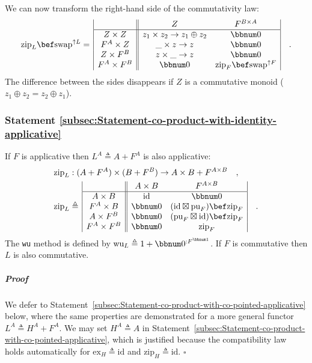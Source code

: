 We can now transform the right-hand side of the commutativity law:
\[
\text{zip}_{L}\bef\text{swap}^{\uparrow L}=\,\begin{array}{|c||cc|}
 & Z & F^{B\times A}\\
\hline Z\times Z & z_{1}\times z_{2}\rightarrow z_{1}\oplus z_{2} & \bbnum 0\\
F^{A}\times Z & \_\times z\rightarrow z & \bbnum 0\\
Z\times F^{B} & z\times\_\rightarrow z & \bbnum 0\\
F^{A}\times F^{B} & \bbnum 0 & \text{zip}_{F}\bef\text{swap}^{\uparrow F}
\end{array}\quad.
\]
The difference between the sides disappears if $Z$ is a commutative
monoid ($z_{1}\oplus z_{2}=z_{2}\oplus z_{1}$). 

\subsubsection{Statement \label{subsec:Statement-co-product-with-identity-applicative}\ref{subsec:Statement-co-product-with-identity-applicative}}

If $F$ is applicative then $L^{A}\triangleq A+F^{A}$ is also applicative:
\begin{align*}
 & \text{zip}_{L}:(A+F^{A})\times(B+F^{B})\rightarrow A\times B+F^{A\times B}\quad,\\
 & \text{zip}_{L}\triangleq\,\begin{array}{|c||cc|}
 & A\times B & F^{A\times B}\\
\hline A\times B & \text{id} & \bbnum 0\\
F^{A}\times B & \bbnum 0 & (\text{id}\boxtimes\text{pu}_{F})\bef\text{zip}_{F}\\
A\times F^{B} & \bbnum 0 & (\text{pu}_{F}\boxtimes\text{id})\bef\text{zip}_{F}\\
F^{A}\times F^{B} & \bbnum 0 & \text{zip}_{F}
\end{array}\quad.
\end{align*}
The \lstinline!wu! method is defined by $\text{wu}_{L}\triangleq1+\bbnum 0^{:F^{\bbnum 1}}$.
If $F$ is commutative then $L$ is also commutative.

\subparagraph{Proof}

We defer to Statement~\ref{subsec:Statement-co-product-with-co-pointed-applicative}
below, where the same properties are demonstrated for a more general
functor $L^{A}\triangleq H^{A}+F^{A}$. We may set $H^{A}\triangleq A$
in Statement~\ref{subsec:Statement-co-product-with-co-pointed-applicative},
which is justified because the compatibility law holds automatically
for $\text{ex}_{H}\triangleq\text{id}$ and $\text{zip}_{H}\triangleq\text{id}$.
 $\square$

